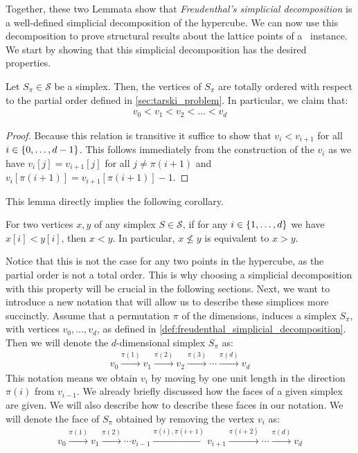 Together, these two Lemmata show that \textit{Freudenthal's simplicial decomposition} is a well-defined simplicial decomposition of the hypercube. We can now use this decomposition to prove structural results about the lattice points of a \Tarski\ instance. We start by showing that this simplicial decomposition has the desired properties.
\begin{lemma}
	Let $S_{\pi} \in \mathcal{S}$ be a simplex. Then, the vertices of $S_{\pi}$ are totally ordered with respect to the partial order defined in \cref{sec:tarski_problem}. In particular, we claim that:
	\begin{align*}
		v_0 < v_1 < v_2 < \dots < v_d
	\end{align*}
\end{lemma}
\begin{proof}
	Because this relation is transitive it suffice to show that $v_i < v_{i+1}$ for all $i \in \left\{0, \dots, d-1\right\}$. This follows immediately from the construction of the $v_i$ as we have $v_i[j] = v_{i+1}[j]$ for all $j \neq \pi(i+1)$ and $v_i[\pi(i+1)] = v_{i+1}[\pi(i+1)] - 1$.
\end{proof}
This lemma directly implies the following corollary.
\begin{corollary}
	\label{cor:total_ordering}
	For two vertices $x,y$ of any simplex $S \in \mathcal{S}$, if for any $i \in \left\{1, \dots, d\right\}$ we have $x[i] < y[i]$, then $x < y$. In particular, $x \not\leq y$ is equivalent to $x > y$.
\end{corollary}
Notice that this is not the case for any two points in the hypercube, as the partial order is not a total order. This is why choosing a simplicial decomposition with this property will be crucial in the following sections. Next, we want to introduce a new notation that will allow us to describe these simplices more succinctly. Assume that a permutation $\pi$ of the dimensions, induces a simplex $S_{\pi}$, with vertices $v_0, \dots, v_d$, as defined in \cref{def:freudenthal_simplicial_decomposition}. Then we will denote the $d$-dimensional simplex $S_{\pi}$ as:
\begin{align*}
	v_0 \xrightarrow{\pi(1)} v_1 \xrightarrow{\pi(2)} v_2 \xrightarrow{\pi(3)} \cdots \xrightarrow{\pi(d)} v_d
\end{align*}
This notation means we obtain $v_i$ by moving by one unit length in the direction $\pi(i)$ from $v_{i-1}$. We already briefly discussed how the faces of a given simplex are given. We will also describe how to describe these faces in our notation. We will denote the face of $S_{\pi}$ obtained by removing the vertex $v_i$ as:
\begin{align*}
	v_0 \xrightarrow{\pi(1)} v_1 \xrightarrow{\pi(2)} \cdots v_{i-1} \xrightarrow{\pi(i), \pi(i+1)} v_{i+1} \xrightarrow{\pi(i+2)} \cdots \xrightarrow{\pi(d)} v_d
\end{align*}

